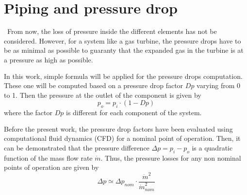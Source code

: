 \section{Piping and pressure drop}
\quad\, From now, the loss of pressure inside the different elements has not be considered. However, for a system like a gas turbine, the pressure drops have to be as minimal as possible to guaranty that the expanded gas in the turbine is at a pressure as high as possible. 

In this work, simple formula will be applied for the pressure drops computation. These one will be computed based on a pressure drop factor $Dp$ varying from 0 to 1. Then the pressure at the outlet of the component is given by
\begin{equation}
p_{o} = p_{i}\cdot (1 - Dp)
\end{equation}
where the factor $Dp$ is different for each component of the system. 

Before the present work, the pressure drop factors have been evaluated using computational fluid dynamics (CFD) for a nominal point of operation. Then, it can be demonstrated that the pressure difference $\Delta p = p_{i} - p_{o}$ is a quadratic function of the mass flow rate $\dot{m}$. Thus, the pressure losses for any non nominal points of operation are given by
\begin{equation}
\Delta p \simeq \Delta p_{nom}\cdot \frac{\dot{m}^2}{\dot{m}^2_{nom}}
\end{equation}